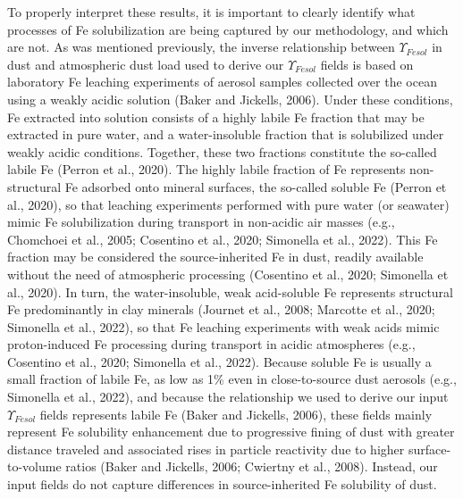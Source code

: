 To properly interpret these results, it is important to clearly identify what processes of Fe solubilization are being captured by our methodology, and which are not. As was mentioned previously, the inverse relationship between $\Upsilon_{Fesol}$ in dust and atmospheric dust load used to derive our $\Upsilon_{Fesol}$ fields is based on laboratory Fe leaching experiments of aerosol samples collected over the ocean using a weakly acidic solution (Baker and Jickells, 2006). Under these conditions, Fe extracted into solution consists of a highly labile Fe fraction that may be extracted in pure water, and a water-insoluble fraction that is solubilized under weakly acidic conditions. Together, these two fractions constitute the so-called labile Fe (Perron et al., 2020). The highly labile fraction of Fe represents non-structural Fe adsorbed onto mineral surfaces, the so-called soluble Fe (Perron et al., 2020), so that leaching experiments performed with pure water (or seawater) mimic Fe solubilization during transport in non-acidic air masses (e.g., Chomchoei et al., 2005; Cosentino et al., 2020; Simonella et al., 2022). This Fe fraction may be considered the source-inherited Fe in dust, readily available without the need of atmospheric processing (Cosentino et al., 2020; Simonella et al., 2020). In turn, the water-insoluble, weak acid-soluble Fe represents structural Fe predominantly in clay minerals (Journet et al., 2008; Marcotte et al., 2020; Simonella et al., 2022), so that Fe leaching experiments with weak acids mimic proton-induced Fe processing during transport in acidic atmospheres (e.g., Cosentino et al., 2020; Simonella et al., 2022). Because soluble Fe is usually a small fraction of labile Fe, as low as 1\% even in close-to-source dust aerosols (e.g., Simonella et al., 2022), and because the relationship we used to derive our input $\Upsilon_{Fesol}$ fields represents labile Fe (Baker and Jickells, 2006), these fields mainly represent Fe solubility enhancement due to progressive fining of dust with greater distance traveled and associated rises in particle reactivity due to higher surface-to-volume ratios (Baker and Jickells, 2006; Cwiertny et al., 2008). Instead, our input fields do not capture differences in source-inherited Fe solubility of dust.


